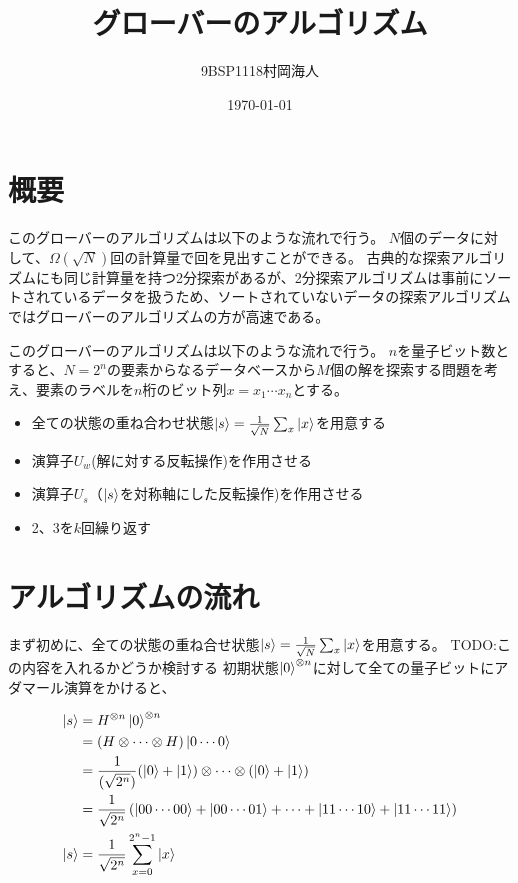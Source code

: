 \documentclass[platex,dvipdfmx]{jlreq}			%
\title{グローバーのアルゴリズム}
\author{9BSP1118村岡海人}
\date{\today}
\begin{document}
    \maketitle

    \section{概要}
    このグローバーのアルゴリズムは以下のような流れで行う。
    $N$個のデータに対して、$\Omega(\sqrt{N})$回の計算量で回を見出すことができる。
    古典的な探索アルゴリズムにも同じ計算量を持つ2分探索があるが、2分探索アルゴリズムは事前にソートされているデータを扱うため、ソートされていないデータの探索アルゴリズムではグローバーのアルゴリズムの方が高速である。

    このグローバーのアルゴリズムは以下のような流れで行う。
    $n$を量子ビット数とすると、$N = 2^n$の要素からなるデータベースから$M$個の解を探索する問題を考え、要素のラベルを$n$桁のビット列$x = x_1 \cdots x_n$とする。

    \begin{itemize}
        \item 全ての状態の重ね合わせ状態$\ket{s} = \frac{1}{\sqrt{N}} \sum_x \ket{x}$を用意する 
        \item 演算子$U_w$(解に対する反転操作)を作用させる 
        \item 演算子$U_s$（$\ket{s}$を対称軸にした反転操作)を作用させる 
        \item 2、3を$k$回繰り返す 
    \end{itemize}

    \section{アルゴリズムの流れ}
    まず初めに、全ての状態の重ね合せ状態$\ket{s} = \frac{1}{\sqrt{N}} \sum_x \ket{x}$を用意する。
    TODO:この内容を入れるかどうか検討する
    初期状態$\ket{0}^{\otimes n}$に対して全ての量子ビットにアダマール演算をかけると、

    \begin{equation}
        \begin{split}
        \ket{s} &= H^{\otimes n} \ket{0}^{\otimes n} \\ 
        &= (H \otimes \cdots \otimes H)\ket{0\cdots0} \\
        &= \frac{1}{(\sqrt{2^n})} (\ket{0} + \ket{1})\otimes\cdots\otimes (\ket{0} + \ket{1}) \\
        &= \frac{1}{\sqrt{2^n}} \left( \ket{00 \cdots 00} + \ket{00 \cdots 01} + \cdots + \ket{11 \cdots 10} + \ket{11 \cdots 11}\right) \\
        \ket{s} &= \frac{1}{\sqrt{2^n}} \sum^{2^n - 1}_{x = 0} \ket{x}
        \end{split}
    \end{equation}
\end{document}
